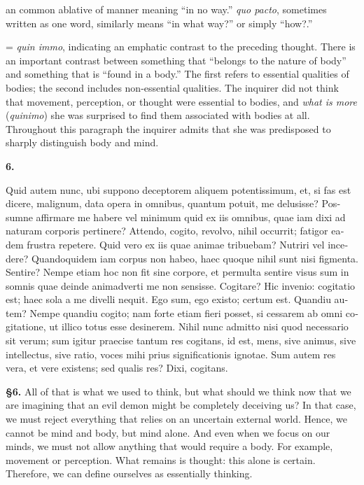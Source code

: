  an common ablative of manner meaning ``in no way.'' \textit{quo pacto}, sometimes written as one word, similarly means ``in what way?'' or simply ``how?.''

 = \textit{quin immo}, indicating an emphatic contrast to the preceding thought. There is an important contrast between something that ``belongs to the nature of body'' and something that is ``found in a body.'' The first refers to essential qualities of bodies; the second includes non-essential qualities. The inquirer did not think that movement, perception, or thought were essential to bodies, and \textit{what is more} (\textit{quinimo}) she was surprised to find them associated with bodies at all. Throughout this paragraph the inquirer admits that she was predisposed to sharply distinguish body and mind.

\clearpage

\beginnumbering
\pstart
    \textbf{6.} \begin{latin}Quid autem nunc, ubi suppono deceptorem aliquem potentissimum, et, si fas est dicere, malignum, data opera in omnibus, quantum potuit, me delusisse? Possumne affirmare me habere vel minimum quid ex iis omnibus, quae iam dixi ad naturam corporis pertinere? Attendo, cogito, revolvo, nihil occurrit; fatigor eadem frustra repetere. Quid vero ex iis quae animae tribuebam? Nutriri vel incedere? Quandoquidem iam corpus non habeo, haec quoque nihil sunt nisi figmenta. Sentire? Nempe etiam hoc non fit sine corpore, et permulta sentire visus sum in somnis quae deinde animadverti me non sensisse. Cogitare? Hic invenio: cogitatio est; haec sola a me divelli nequit. Ego sum, ego existo; certum est. Quandiu autem? Nempe quandiu cogito; nam forte etiam fieri posset, si cessarem ab omni cogitatione, ut illico totus esse desinerem. Nihil nunc admitto nisi quod necessario sit verum; sum igitur praecise tantum res cogitans, id est, mens, sive animus, sive intellectus, sive ratio, voces mihi prius significationis ignotae. Sum autem res vera, et vere existens; sed qualis res? Dixi, cogitans.\end{latin}
\pend
\endnumbering

\prenotes

\textbf{§6.} All of that is what we used to think, but what should we think now that we are imagining that an evil demon might be completely deceiving us? In that case, we must reject everything that relies on an uncertain external world. Hence, we cannot be mind and body, but mind alone. And even when we focus on our minds, we must not allow anything that would require a body. For example, movement or perception. What remains is thought: this alone is certain. Therefore, we can define ourselves as essentially thinking.

